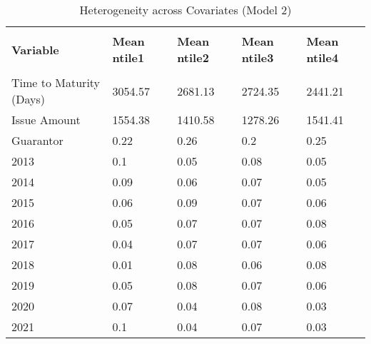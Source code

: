 \begin{table}[]
\caption{Heterogeneity across Covariates (Model 2)}
\label{Het1}
\footnotesize
\begin{tabular}{lllll}
\\[-1.8ex]\hline 
\hline \\[-1.8ex] 
{\color[HTML]{333333} \textbf{Variable}} & {\color[HTML]{333333} \textbf{Mean ntile1}} & {\color[HTML]{333333} \textbf{Mean ntile2}} & {\color[HTML]{333333} \textbf{Mean ntile3}} & {\color[HTML]{333333} \textbf{Mean ntile4}} \\
\hline \\[-1.8ex] 
Time to   Maturity (Days) & \cellcolor[HTML]{63BE7B}3054.57 & \cellcolor[HTML]{C1E4CC}2681.13 & \cellcolor[HTML]{B6E0C3}2724.35 & \cellcolor[HTML]{FCFCFF}2441.21 \\
Issue Amount & \cellcolor[HTML]{63BE7B}1554.38 & \cellcolor[HTML]{B3DFC0}1410.58 & \cellcolor[HTML]{FCFCFF}1278.26 & \cellcolor[HTML]{6BC182}1541.41 \\
Guarantor & \cellcolor[HTML]{DBEFE2}0.22 & \cellcolor[HTML]{D5ECDD}0.26 & \cellcolor[HTML]{DEF0E5}0.2 & \cellcolor[HTML]{D6EDDE}0.25 \\
2013 & \cellcolor[HTML]{EDF6F2}0.1 & \cellcolor[HTML]{F5F9F9}0.05 & \cellcolor[HTML]{F0F8F5}0.08 & \cellcolor[HTML]{F5F9F9}0.05 \\
2014 & \cellcolor[HTML]{EFF7F4}0.09 & \cellcolor[HTML]{F3F9F8}0.06 & \cellcolor[HTML]{F2F8F6}0.07 & \cellcolor[HTML]{F5F9F9}0.05 \\
2015 & \cellcolor[HTML]{F3F9F8}0.06 & \cellcolor[HTML]{EFF7F4}0.09 & \cellcolor[HTML]{F2F8F6}0.07 & \cellcolor[HTML]{F3F9F8}0.06 \\
2016 & \cellcolor[HTML]{F5F9F9}0.05 & \cellcolor[HTML]{F2F8F6}0.07 & \cellcolor[HTML]{F2F8F6}0.07 & \cellcolor[HTML]{F0F8F5}0.08 \\
2017 & \cellcolor[HTML]{F6FAFA}0.04 & \cellcolor[HTML]{F2F8F6}0.07 & \cellcolor[HTML]{F2F8F6}0.07 & \cellcolor[HTML]{F3F9F8}0.06 \\
2018 & \cellcolor[HTML]{FBFCFE}0.01 & \cellcolor[HTML]{F0F8F5}0.08 & \cellcolor[HTML]{F3F9F8}0.06 & \cellcolor[HTML]{F0F8F5}0.08 \\
2019 & \cellcolor[HTML]{F5F9F9}0.05 & \cellcolor[HTML]{F0F8F5}0.08 & \cellcolor[HTML]{F2F8F6}0.07 & \cellcolor[HTML]{F3F9F8}0.06 \\
2020 & \cellcolor[HTML]{F2F8F6}0.07 & \cellcolor[HTML]{F6FAFA}0.04 & \cellcolor[HTML]{F0F8F5}0.08 & \cellcolor[HTML]{F8FBFC}0.03 \\
2021 & \cellcolor[HTML]{EDF6F2}0.1 & \cellcolor[HTML]{F6FAFA}0.04 & \cellcolor[HTML]{F2F8F6}0.07 & \cellcolor[HTML]{F8FBFC}0.03 \\

\end{tabular}
\end{table}
